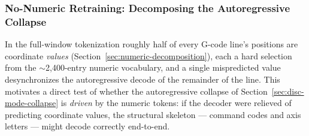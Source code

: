 %
%
%

\subsubsection{No-Numeric Retraining: Decomposing the Autoregressive Collapse}
\label{sec:abl-nonumeric}

In the full-window tokenization roughly half of every G-code line's positions
are coordinate \emph{values} (Section~\ref{sec:numeric-decomposition}), each a
hard selection from the $\sim$2{,}400-entry numeric vocabulary, and a single
mispredicted value desynchronizes the autoregressive decode of the remainder
of the line. This motivates a direct test of whether the autoregressive
collapse of Section~\ref{sec:disc-mode-collapse} is \emph{driven} by the
numeric tokens: if the decoder were relieved of predicting coordinate values,
the structural skeleton --- command codes and axis letters --- might decode
correctly end-to-end.

